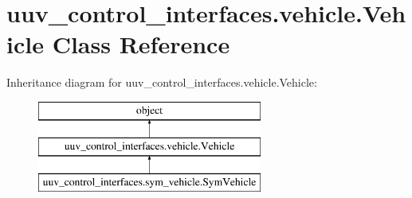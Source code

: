 \hypertarget{classuuv__control__interfaces_1_1vehicle_1_1Vehicle}{}\section{uuv\+\_\+control\+\_\+interfaces.\+vehicle.\+Vehicle Class Reference}
\label{classuuv__control__interfaces_1_1vehicle_1_1Vehicle}
Inheritance diagram for uuv\+\_\+control\+\_\+interfaces.\+vehicle.\+Vehicle\+:\begin{figure}[H]
\begin{center}
\leavevmode
\includegraphics[height=3.000000cm]{classuuv__control__interfaces_1_1vehicle_1_1Vehicle}
\end{center}
\end{figure}
